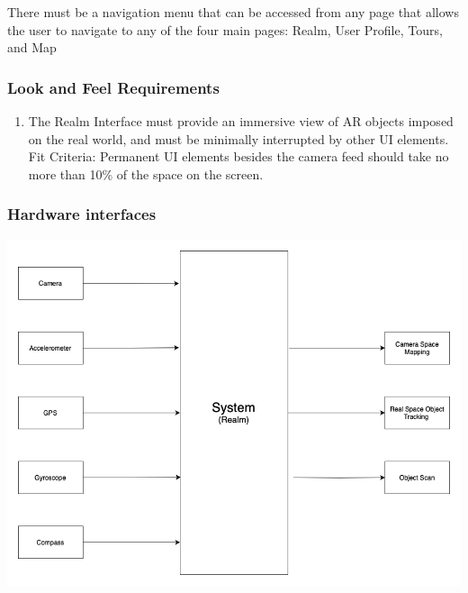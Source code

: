 \documentclass{article}
\begin{document}
There must be a navigation menu that can be accessed from any page that allows the user to navigate to any of the four main pages: Realm, User Profile, Tours, and Map

\subsubsection{Look and Feel Requirements}



\begin{enumerate}[align=left, label=\textbf{EI-LF\arabic*:}]
    \item The Realm Interface must provide an immersive view of AR objects imposed on the real world, and must be minimally interrupted by other UI elements. \\
          Fit Criteria: Permanent UI elements besides the camera feed should take no more than 10\% of the space on the screen. \\

\end{enumerate}





\subsubsection{Hardware interfaces}

\begin{center}
    \includegraphics[scale=0.4]{OtherDiagrams/hscd.png}
\end{center}
\end{document}
